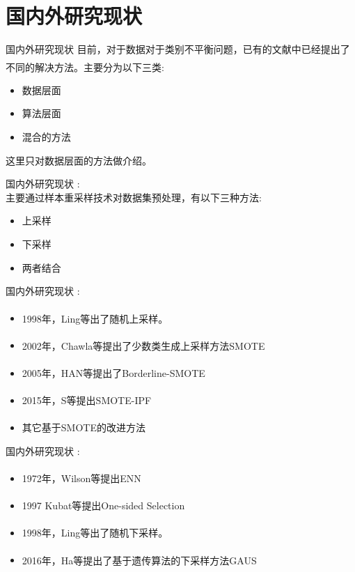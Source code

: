 \documentclass{beamer}
\newcommand{\upcite}[1]{\textsuperscript{\textsuperscript{\cite{#1}}}} %
\begin{document}
\section{国内外研究现状}
\begin{frame}{国内外研究现状}\pause
    目前，对于数据对于类别不平衡问题，已有的文献中已经提出了不同的解决方法。主要分为以下三类\upcite{spelmen2018review}:
    \begin{itemize}
        \item 数据层面
        \item 算法层面
        \item 混合的方法
    \end{itemize}

    这里只对数据层面的方法做介绍。    
\end{frame}

\begin{frame}{国内外研究现状}\pause
    :\\
    主要通过样本重采样技术对数据集预处理，有以下三种方法:
    \begin{itemize}
        \item 上采样
        \item 下采样
        \item 两者结合
    \end{itemize}
\end{frame}

\begin{frame}{国内外研究现状}\pause
    :\\
    \begin{itemize}
        \item 
        1998年，Ling等\upcite{ling1998data}出了随机上采样。
        \item 
        2002年，Chawla等\upcite{chawla2002smote}提出了少数类生成上采样方法SMOTE
        \item  
        2005年，HAN等\upcite{han2005borderline}提出了Borderline-SMOTE
        \item  
        2015年，S等\upcite{saez2015smote}提出SMOTE-IPF
        \item  
        其它基于SMOTE的改进方法\upcite{hu2009msmote, ali2019imbalance}
    \end{itemize}
    
\end{frame}

\begin{frame}{国内外研究现状}\pause
    :\\
    \begin{itemize}
        \item  
        1972年，Wilson等\upcite{wilson1972asymptotic}提出ENN
        \item 
        1997 Kubat等\upcite{kubat1997addressing}提出One-sided Selection
        \item 
        1998年，Ling等\upcite{ling1998data}出了随机下采样。
        \item 
        2016年，Ha等\upcite{ha2016new}提出了基于遗传算法的下采样方法GAUS 
    \end{itemize}
    
\end{frame}
\end{document}
